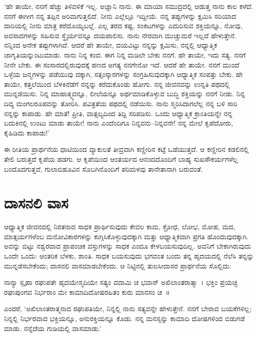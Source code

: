‘ಹೇ ತಾಯೇ, ನನಗೆ ಹೆಚ್ಚು ತಿಳಿವಳಿಕೆ ಇಲ್ಲ. ಅಜ್ಞಾನಿ ನಾನು. ಈ ಮಾಯಾ ಸಮುದ್ರದಲ್ಲಿ ಆಡುತ್ತ ನಾನು ಕಾಲ ಕಳೆದೆ. ನನಗೆ ಈಗೀಗ ನನ್ನ ತಪ್ಪಿನ ಅರಿವಾಗುತ್ತಲಿದೆ. ನೀನು ಎಲ್ಲೆಲ್ಲೂ ಇದ್ದೀಯೆ. ನನ್ನ ತಪ್ಪುಗಳನ್ನು ಕ್ಷಮಿಸಿ ಸರಿಯಾದ ದಾರಿಯಲ್ಲಿ ನೀನು ಮಾತ್ರ ಕರೆದೊಯ್ಯಬಲ್ಲೆ. ಎಲ್ಲ ತರದ ಕಷ್ಟ, ಸಂಕಟಗಳನ್ನು ಎದುರಿಸುವ ಶಕ್ತಿಯನ್ನೂ, ನೋವು, ಅವಸಾದಗಳನ್ನು ಸಹಿಸುವ ಸ್ಥೈರ್ಯವನ್ನೂ ದಯಪಾಲಿಸು. ನಾನು ನೇರವಾಗಿ ಮುಚ್ಚುಮರೆ ಇಲ್ಲದೆ ಹೇಳುತ್ತೇನೆ. ನನ್ನಿಂದ ಅನೇಕ ತಪ್ಪುಗಳಾಗಿವೆ. ಆದರೆ ಹೇ ತಾಯೇ, ದಯವಿಟ್ಟು ನನ್ನನ್ನು ಕ್ಷಮಿಸು, ನನ್ನಲ್ಲಿ ಆಧ್ಯಾತ್ಮಿಕ ಜಾಗೃತಿಯನ್ನುಂಟುಮಾಡು. ನಾನು ನಿನ್ನ ಕಂದ. ಈಗ ನಿನ್ನ ಮಡಿಲೇ ಬೇಕು ನನಗೆ. ಹೇ ತಾಯೇ, ಇದು ಸತ್ಯ. ನನಗೆ ನೀನೇ ಬೇಕು. ಈ ಸಂಸಾರದಲ್ಲಿರುವುದಕ್ಕೆ ಹಣದ ಅಗತ್ಯ ನನಗೇನೋ ಇದೆ. ಆದರೆ ಹೇ ತಾಯೇ. ನನಗೆ ಮುಂದೆ ಒಳ್ಳೆಯ ಜನ್ಮಗಳನ್ನು ಪಡೆಯುವು ದಕ್ಕಾಗಿ, ಸತ್ಸಂಸ್ಕಾರಗಳನ್ನು ಸಂಗ್ರಹಿಸುವುದಕ್ಕಾಗಿ ಆಧ್ಯಾತ್ಮಿಕ ಸಂಪತ್ತು ಬೇಕು. ಹೇ ತಾಯೇ, ಕತ್ತಲೆಯಿಂದ ಬೆಳಕಿನೆಡೆಗೆ ನನ್ನನ್ನು ಕರೆದುಕೊಂಡು ಹೋಗು. ನನ್ನ ಜೀವನವನ್ನು ಉನ್ನತಿ ಪಥದಲ್ಲಿ ಮುನ್ನಡೆಯಿಸು. ನಿನ್ನ ಮಾಹಾತ್ಮ್ಯವನ್ನೂ, ಲೀಲೆಯನ್ನೂ ಅರ್ಥಮಾಡಿಕೊಳ್ಳುವ ಬುದ್ಧಿ ಶಕ್ತಿಯನ್ನು ನನಗೆ ನೀಡು. ನಿನ್ನ ದಿವ್ಯ ಮಂಗಲರೂಪವನ್ನು ತೋರಿಸಿ. ಪವಿತ್ರತೆಯ ಪಥದಲ್ಲಿ ನಡೆಯಿಸು. ನಾನು ಸ್ಮರಿಸಿದಾಗಲೆಲ್ಲ ನನ್ನ ಬಳಿ ಸಾರಿ ನನ್ನನ್ನು ಕಾಪಾಡು. ಹೇ ಮಾತೆ! ಪ್ರೀತಿ, ವಾತ್ಸಲ್ಯದಿಂದ ತಿದ್ದಿ ಸರಿಪಡಿಸು. ಒಂದು ಆಧ್ಯಾತ್ಮಿಕ ಕ್ರಾಂತಿಯನ್ನೇ ನನ್ನ ಬದುಕಿನಲ್ಲಿ ಉಂಟು ಮಾಡು ತಾಯೇ! ನಾನು ಎಂದೆಂದಿಗೂ ನಿನ್ನವನು–ನಿನ್ನವನೇ! ನನ್ನ ಮೇಲೆ ಕೃಪೆದೋರು, ಕೈಹಿಡಿದು ಕಾಪಾಡು!’

\vskip 2pt

ಈ ರೀತಿಯ ಪ್ರಾರ್ಥನೆಯ ಧಾಟಿಯಿಂದ ವ್ಯಾಕುಲತೆ ತೀವ್ರವಾಗಿ ಕಣ್ಣೀರಿನ ಕಟ್ಟೆ ಒಡೆಯುತ್ತದೆ. ಆ ಕಣ್ಣೀರಿನ ಕಡಲಿನಲ್ಲಿ ತೇಲಿ ಬರುತ್ತದೆ ಕೃಪೆಯ ಹಡಗು. ಆ ಕೃಪೆಯಿಂದ ಆಂತರ್ಯದ ಆನಂದದೊಂದಿಗೆ ಬಾಹ್ಯ ಸುಖಸೌಕರ್ಯಗಳೆಲ್ಲ ಬಂದೊದಗುತ್ತವೆ, ಗುಲಾಬಿಹೂವಿನ ಸೊಬಗಿ\-ನೊಂದಿಗೆ ಪರಿಮಳವು ತಾನೇತಾನಾಗಿ ಬರುವಂತೆ.


\section*{ದಾಸನಲಿ ವಾಸ}


ಆಧ್ಯಾತ್ಮಿಕ ಜೀವನದಲ್ಲಿ ನಿರತನಾದ ಸಾಧಕ ಪ್ರಾರ್ಥಿಸುವುದು ಕೇವಲ ಕಾಮ, ಕ್ರೋಧ, ಲೋಭ, ಮೋಹ, ಮದ, ಮಾತ್ಸರ್ಯಗಳೆಂಬ ಮನೋವಿಕಾರಗಳನ್ನು ಕುಗ್ಗಿಸಿಕೊಳ್ಳುವುದಕ್ಕಾಗಿ ಮತ್ತು ಆಧ್ಯಾತ್ಮಿಕವಾಗಿ ಪ್ರಗತಿ ಹೊಂದುವುದಕ್ಕಾಗಿ. ಅವನ್ನು ಬಿಟ್ಟು ನಶ್ವರವಾದ ಪ್ರಾಪಂಚಿಕ ವಸ್ತುಗಳನ್ನು ಸಾಧಕ ಎಂದೂ ಕೇಳಬಯಸುವುದಿಲ್ಲ. ಅವನಿಗೆ ಬೇಕಾಗಿರುವುದು ಒಂದೇ ಒಂದು: ಆಂತರಿಕ ಬೆಳಕು, ಶಾಂತಿ. ಸಾಧಕ ಬಯಸುವುದು ಭಗವಂತ ಬಂದು ತನ್ನ ಹೃದಯದಲ್ಲಿ ನೆಲೆಸಿ ತನ್ನನ್ನು ಮುನ್ನಡೆಸಬೇಕೆಂದು; ದಾಸನಲಿ ವಾಸಮಾಡಬೇಕೆಂದು. ಆ ನಿಟ್ಟಿನಲ್ಲಿ ತುಲಸೀದಾಸರ ಪ್ರಾರ್ಥನೆಯ ಸೊಲ್ಲಿದು:

ನಾನ್ಯಾ ಸ್ಪೃಹಾ ರಘುಪತೇ ಹೃದಯೇಸ್ಮದಿಯೇ ಸತ್ಯಂ ವದಾಮಿ ಚ ಭವಾನ್ ಅಖಿಲಾಂತ\-ರಾತ್ಮಾ~। ಭಕ್ತಿಂ ಪ್ರಯಚ್ಛ ರಘುಪುಂಗವ ನಿರ್ಭರಾಂ ಮೇ ಕಾಮಾದಿದೋಷರಹಿತಂ ಕುರು ಮಾನಸಂ ಚ~॥

ಎಂದರೆ, ‘ಅಖಿಲಾಂತರಾತ್ಮನಾದ ರಘುಪತಿಯೇ, ನಿನ್ನಲ್ಲಿ ನಾನು ಸತ್ಯವನ್ನೇ ಹೇಳುತ್ತೇನೆ. ನನಗೆ ಬೇರಾವ ಬಯಕೆಗಳಿಲ್ಲ; ನಿನ್ನಲ್ಲಿ ನಿರ್ಭರವಾದ ಭಕ್ತಿಯನ್ನೂ, ಅನುರಕ್ತಿಯನ್ನೂ ಕೊಡು. ನನ್ನ ಮನಸ್ಸನ್ನು ಕಾಮಾದಿ ದೋಷಗಳಿಂದ ಬಿಡುಗಡೆ ಮಾಡು. ನನ್ನೆದೆಯ ಗುಡಿಯಲ್ಲಿ ವಾಸ\-ಮಾಡು.’



